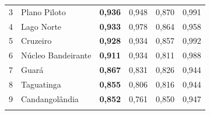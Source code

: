 \begin{center}
\begin{table}[]
{\begin{tabular}{llllll}
                {\color[HTML]{202122} 3} &
                {\color[HTML]{202122} Plano Piloto} &
                {\color[HTML]{202122} \textbf{0,936}} &
                {\color[HTML]{202122} 0,948} &
                {\color[HTML]{202122} 0,870} &
                {\color[HTML]{202122} 0,991} \\
                \rowcolor[HTML]{F8F9FA}
                {\color[HTML]{202122} 4} &
                {\color[HTML]{202122} Lago Norte} &
                {\color[HTML]{202122} \textbf{0,933}} &
                {\color[HTML]{202122} 0,978} &
                {\color[HTML]{202122} 0,864} &
                {\color[HTML]{202122} 0,958} \\
                \rowcolor[HTML]{F8F9FA}
                {\color[HTML]{202122} 5} &
                {\color[HTML]{202122} Cruzeiro} &
                {\color[HTML]{202122} \textbf{0,928}} &
                {\color[HTML]{202122} 0,934} &
                {\color[HTML]{202122} 0,857} &
                {\color[HTML]{202122} 0,992} \\
                \rowcolor[HTML]{F8F9FA}
                {\color[HTML]{202122} 6} &
                {\color[HTML]{202122} Núcleo Bandeirante} &
                {\color[HTML]{202122} \textbf{0,911}} &
                {\color[HTML]{202122} 0,934} &
                {\color[HTML]{202122} 0,811} &
                {\color[HTML]{202122} 0,988} \\
                \rowcolor[HTML]{F8F9FA}
                {\color[HTML]{202122} 7} &
                {\color[HTML]{202122} Guará} &
                {\color[HTML]{202122} \textbf{0,867}} &
                {\color[HTML]{202122} 0,831} &
                {\color[HTML]{202122} 0,826} &
                {\color[HTML]{202122} 0,944} \\
                \rowcolor[HTML]{F8F9FA}
                {\color[HTML]{202122} 8} &
                {\color[HTML]{202122} Taguatinga} &
                {\color[HTML]{202122} \textbf{0,855}} &
                {\color[HTML]{202122} 0,806} &
                {\color[HTML]{202122} 0,816} &
                {\color[HTML]{202122} 0,944} \\
                \rowcolor[HTML]{F8F9FA}
                {\color[HTML]{202122} 9} &
                {\color[HTML]{202122} Candangolândia} &
                {\color[HTML]{202122} \textbf{0,852}} &
                {\color[HTML]{202122} 0,761} &
                {\color[HTML]{202122} 0,850} &
                {\color[HTML]{202122} 0,947} \\
                \rowcolor[HTML]{F8F9FA}

\end{tabular}}
\end{table}
\end{center}

